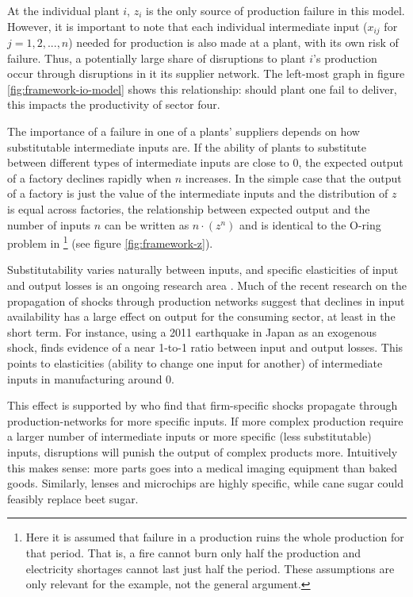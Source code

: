 \documentclass[11pt]{article}
\begin{document}
At the individual plant \(i\), \(z_i\) is the only source of production failure in this model. However, it is important to note that each individual intermediate input (\(x_{ij}\) for \(j = 1, 2, ..., n\)) needed for production is also made at a plant, with its own risk of failure. Thus, a potentially large share of disruptions to plant $i$'s production occur through disruptions in it its supplier network. The left-most graph in figure \ref{fig:framework-io-model} shows this relationship: should plant one fail to deliver, this impacts the productivity of sector four.

The importance of a failure in one of a plants' suppliers depends on how substitutable intermediate inputs are. If the ability of plants to substitute between different types of intermediate inputs are close to 0, the expected output of a factory declines rapidly when \(n\) increases. In the simple case that the output of a factory is just the value of the intermediate inputs and the distribution of \(z\) is equal across factories, the relationship between expected output and the number of inputs \(n\) can be written as \(n\cdot(z^{n})\) and is identical to the O-ring problem in \cite{kremer_o-ring_1993}\footnote{Here it is assumed that failure in a production ruins the whole production for that period. That is, a fire cannot burn only half the production and electricity shortages cannot last just half the period. These assumptions are only relevant for the example, not the general argument.} (see figure \ref{fig:framework-z}).

Substitutability varies naturally between inputs, and specific elasticities of input and output losses is an ongoing research area \citep{brummitt_contagious_2017,carvalho_micro_2014}. Much of the recent research on the propagation of shocks through production networks suggest that declines in input availability has a large effect on output for the consuming sector, at least in the short term. For instance, using a 2011 earthquake in Japan as an exogenous shock, \cite{boehm_input_2019-1} finds evidence of a near 1-to-1 ratio between input and output losses. This points to elasticities (ability to change one input for another) of intermediate inputs in manufacturing around 0.

This effect is supported by \cite{barrot_input_2016} who find that firm-specific shocks propagate through production-networks for more specific inputs. If more complex production require a larger number of intermediate inputs or more specific (less substitutable) inputs, disruptions will punish the output of complex products more. Intuitively this makes sense: more parts goes into a medical imaging equipment than baked goods. Similarly, lenses and microchips are highly specific, while cane sugar could feasibly replace beet sugar.
\end{document}
